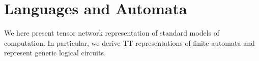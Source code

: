 \section{Languages and Automata}

We here present tensor network representation of standard models of computation.
In particular, we derive TT representations of finite automata and represent generic logical circuits.





